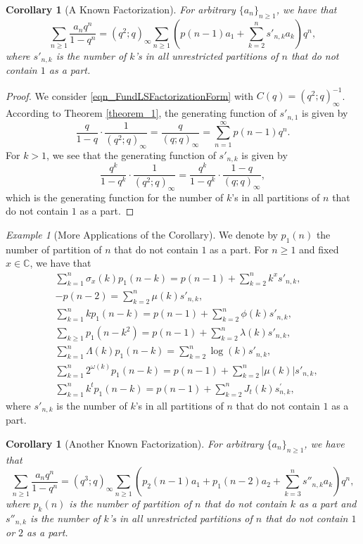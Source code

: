 \documentclass[10pt,reqno]{amsart}
\numberwithin{figure}{section}
\numberwithin{table}{section}
\theoremstyle{plain}
\newtheorem{cor}[theorem]{Corollary}
\numberwithin{theorem}{section}
\theoremstyle{remark}
\newtheorem{example}[theorem]{Example}
\begin{document}
\begin{cor}[A Known Factorization] 
	For arbitrary $\{a_n\}_{n \geq 1}$, we have that 
	$$\sum_{n \geq 1} \frac{a_n q^n}{1-q^n} = (q^2;q)_\infty \sum_{n \geq 1} \left( p(n-1)a_1 + 
\sum_{k=2}^n s'_{n,k} a_k\right) q^n,
$$	
	where $s'_{n,k}$ is the number of $k$'s in all unrestricted partitions of $n$ that do not contain $1$ as a part. 
\end{cor}
\begin{proof} 
We consider \eqref{eqn_FundLSFactorizationForm} with $C(q)=(q^2;q)_{\infty}^{-1}$. According to Theorem \ref{theorem_1}, the generating function of $s'_{n,1}$ is given by
$$\frac{q}{1-q}\cdot \frac{1}{(q^2;q)_\infty} = \frac{q}{(q;q)_\infty} = \sum_{n=1}^{\infty} p(n-1) q^n.$$
For $k>1$, we see that the generating function of $s'_{n,k}$ is given by
$$\frac{q^k}{1-q^k} \cdot \frac{1}{(q^2;q)_\infty} = \frac{q^k}{1-q^k} \cdot \frac{1-q}{(q;q)_\infty},$$
which is the generating function for the number of $k$'s in all partitions of $n$ that do not contain $1$ as a part.
\end{proof} 

\begin{example}[More Applications of the Corollary] 
	We denote by $p_1(n)$ the number of partition of $n$ that do not contain $1$ as a part.
	For $n \geq 1$ and fixed $x \in \mathbb{C}$, we have that 
	\begin{align*}
	& \sum_{k=1}^{n} \sigma_x(k) p_1(n-k) = p(n-1)+\sum_{k=2}^n k^x s'_{n,k},\\
	&  -p(n-2) = \sum_{k=2}^{n} \mu(k) s'_{n,k}, \\
	& \sum_{k=1}^{n} k p_1(n-k) = p(n-1)+\sum_{k=2}^n \phi(k) s'_{n,k},\\
	& \sum_{k\geq 1}  p_1(n-k^2) = p(n-1)+\sum_{k=2}^n \lambda(k) s'_{n,k},\\
	& \sum_{k=1}^n \Lambda(k)  p_1(n-k) = \sum_{k=2}^n \log(k) s'_{n,k},\\
	& \sum_{k=1}^n 2^{\omega(k)}  p_1(n-k) = p(n-1)+\sum_{k=2}^n | \mu(k) | s'_{n,k},\\
	& \sum_{k=1}^n k^t  p_1(n-k) = p(n-1)+\sum_{k=2}^n J_t(k) s_{n,k}^{\prime},
	\end{align*}
	where $s'_{n,k}$ is the number of $k$'s in all partitions of $n$ that do not contain $1$ as a part.
\end{example}

\begin{cor}[Another Known Factorization] 
\label{cor_AnotherKnownFactorization}
	For arbitrary $\{a_n\}_{n \geq 1}$, we have that 
	$$\sum_{n \geq 1} \frac{a_n q^n}{1-q^n} = (q^3;q)_\infty \sum_{n \geq 1} \left( p_2(n-1)a_1 + p_1(n-2)a_2+ 
	\sum_{k=3}^n s''_{n,k} a_k\right) q^n,
	$$	
	where $p_k(n)$ is the number of partition of $n$ that do not contain $k$ as a part and 
	$s''_{n,k}$ is the number of $k$'s in all unrestricted partitions of $n$ that do not contain $1$ or $2$ as a part. 
\end{cor}
\end{document}

